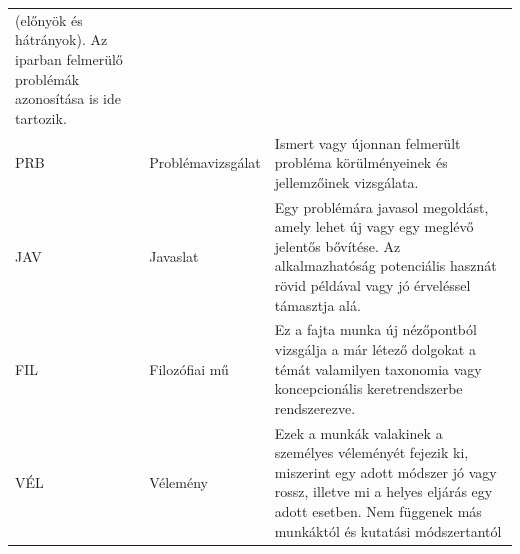 \documentclass[12pt,magyar,a4paper,oneside]{scrreprt}
\begin{document}
\begin{longtable}[]{@{}lll@{}}
\begin{minipage}[t]{0.52\columnwidth}
(előnyök és hátrányok). Az iparban felmerülő problémák azonosítása is
ide tartozik.\strut
\end{minipage}\tabularnewline
\begin{minipage}[t]{0.05\columnwidth}\raggedright
PRB\strut
\end{minipage} & \begin{minipage}[t]{0.34\columnwidth}\raggedright
Problémavizsgálat\strut
\end{minipage} & \begin{minipage}[t]{0.52\columnwidth}\raggedright
Ismert vagy újonnan felmerült probléma körülményeinek és jellemzőinek
vizsgálata.\strut
\end{minipage}\tabularnewline
\begin{minipage}[t]{0.05\columnwidth}\raggedright
JAV\strut
\end{minipage} & \begin{minipage}[t]{0.34\columnwidth}\raggedright
Javaslat\strut
\end{minipage} & \begin{minipage}[t]{0.52\columnwidth}\raggedright
Egy problémára javasol megoldást, amely lehet új vagy egy meglévő
jelentős bővítése. Az alkalmazhatóság potenciális hasznát rövid példával
vagy jó érveléssel támasztja alá.\strut
\end{minipage}\tabularnewline
\begin{minipage}[t]{0.05\columnwidth}\raggedright
FIL\strut
\end{minipage} & \begin{minipage}[t]{0.34\columnwidth}\raggedright
Filozófiai mű\strut
\end{minipage} & \begin{minipage}[t]{0.52\columnwidth}\raggedright
Ez a fajta munka új nézőpontból vizsgálja a már létező dolgokat a témát
valamilyen taxonomia vagy koncepcionális keretrendszerbe
rendszerezve.\strut
\end{minipage}\tabularnewline
\begin{minipage}[t]{0.05\columnwidth}\raggedright
VÉL\strut
\end{minipage} & \begin{minipage}[t]{0.34\columnwidth}\raggedright
Vélemény\strut
\end{minipage} & \begin{minipage}[t]{0.52\columnwidth}\raggedright
Ezek a munkák valakinek a személyes véleményét fejezik ki, miszerint egy
adott módszer jó vagy rossz, illetve mi a helyes eljárás egy adott
esetben. Nem függenek más munkáktól és kutatási módszertantól\strut

\end{minipage}
\end{longtable}
\end{document}
